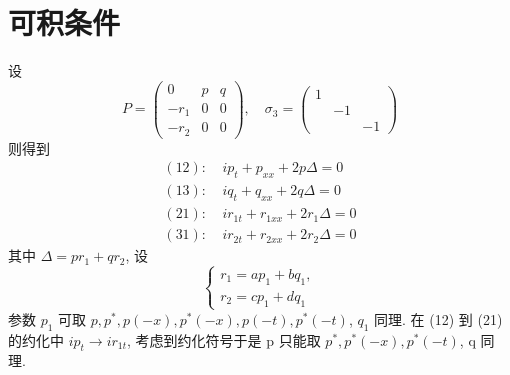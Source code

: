 \section{可积条件}%
 设
\begin{equation*}
    P = \begin{pmatrix}
        0 & p & q \\ -r_{1} & 0 & 0 \\ -r_{2} & 0 & 0
    \end{pmatrix}, \quad
    \sigma_{3} = \begin{pmatrix}
        1 &  & \\ & -1 & \\ & & -1 
    \end{pmatrix}
\end{equation*} 
则得到
\begin{equation}\label{2024.09.28(*)}
    \begin{aligned}
        (12): \ & ip_{t} + p_{xx} + 2p \Delta = 0 \\
        (13): \ & iq_{t} + q_{xx} + 2q \Delta = 0 \\
        (21): \ & ir_{1t} + r_{1xx} + 2r_{1} \Delta = 0 \\
        (31): \ & ir_{2t} + r_{2xx} + 2r_{2} \Delta = 0
    \end{aligned}
\end{equation}
其中 $ \Delta = pr_{1} + qr_{2} $, 设
\begin{equation}
    \begin{cases}
        r_{1} = ap_{1} + bq_{1},\\ 
        r_{2} = cp_{1}+dq_{1}
    \end{cases}
\end{equation}
参数 $ p_1 $ 可取 $ p, p^{*}, p(-x), p^{*}(-x),p(-t), p^{*}(-t) $, $ q_1 $ 同理.
在 (12) 到 (21) 的约化中 $ ip_{t} \to ir_{1t} $, 考虑到约化符号于是 p 只能取 $ p^{*}, p^{*}(-x), p^{*}(-t) $, q 同理. 

